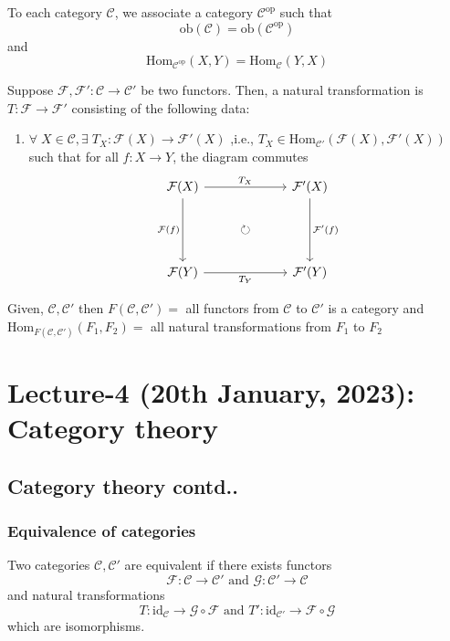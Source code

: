 \documentclass[oneside, 12pt, ]{scrbook}
\theoremstyle{theorem}
\begin{document}
To each category $\mathcal{C}$, we associate a category $\mathcal{C}^{\mathrm{op}}$ such that $$\mathrm{ob}(\mathcal{C}) = \mathrm{ob}(\mathcal{C}^{\mathrm{op}})$$ and $$\mathrm{Hom}_{\mathcal{C}^{\mathrm{op}}}(X,Y) = \mathrm{Hom}_{\mathcal{C}}(Y,X)$$

Suppose $\mathcal{F},\mathcal{F}' : \mathcal{C} \rightarrow \mathcal{C}'$ be two functors. Then, a natural transformation is $T: \mathcal{F} \rightarrow \mathcal{F}'$ consisting of the following data: 
\begin{enumerate}
\item $\forall \; X \in \mathcal{C} , \exists \; T_{X} : \mathcal{F}(X) \rightarrow \mathcal{F}'(X)$ ,i.e., $T_{X} \in \mathrm{Hom}_{\mathcal{C}'}(\mathcal{F}(X),\mathcal{F}' (X))$ such that for all $f: X \rightarrow Y$, the diagram commutes\[\begin{tikzcd}
	{\mathcal{F}(X)} & {} & {\mathcal{F}'(X)} \\
	{} & \circlearrowright & {} \\
	{\mathcal{F}(Y)} && {\mathcal{F}'(Y)}
	\arrow["{T_{X}}", from=1-1, to=1-3]
	\arrow["{\mathcal{F}(f)}"', from=1-1, to=3-1]
	\arrow["{\mathcal{F}'(f)}", from=1-3, to=3-3]
	\arrow["{T_{Y}}"', from=3-1, to=3-3]
\end{tikzcd}\]
\end{enumerate}

Given, $\mathcal{C}, \mathcal{C}'$ then $F(\mathcal{C}, \mathcal{C}')=$ all functors from $\mathcal{C}$ to $\mathcal{C}'$ is a category and $\mathrm{Hom}_{F(\mathcal{C}, \mathcal{C}')}(F_{1},F_{2})=$ all natural transformations from $F_{1}$ to $F_{2}$ 



\chapter{Lecture-4 (20th January, 2023): Category theory}


\section{Category theory contd..}
\subsection{Equivalence of categories}

Two categories $\mathcal{C},\mathcal{C}'$ are equivalent if there exists functors $$\mathcal{F}: \mathcal{C} \rightarrow \mathcal{C}'  \text{ and } \mathcal{G}: \mathcal{C}' \rightarrow \mathcal{C}$$ and natural transformations $$T : \mathrm{id}_{\mathcal{C}} \rightarrow \mathcal{G} \circ \mathcal{F} \text{ and } T' : \mathrm{id}_{\mathcal{C}'} \rightarrow \mathcal{F} \circ \mathcal{G}$$ which are isomorphisms.
\end{document}

